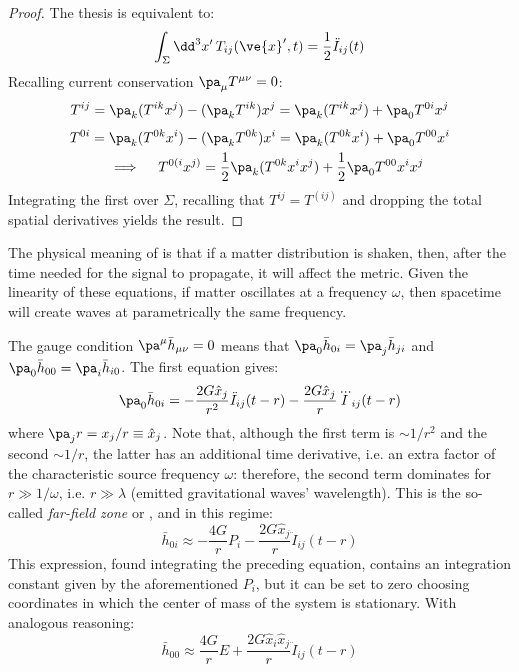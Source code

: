 \begin{proofbox}
  \begin{proof}
    The thesis is equivalent to:
    \begin{equation*}
      \int_\Sigma \dd^3 x'\, T_{ij}(\ve{x}',t) = \frac{1}{2} \ddot{I}_{ij}(t)
    \end{equation*}
    Recalling current conservation $ \pa_\mu T^{\mu \nu} = 0 $:
    \begin{equation*}
      T^{ij} = \pa_k (T^{ik} x^j) - (\pa_k T^{ik}) x^j = \pa_k (T^{ik} x^j) + \pa_0 T^{0i} x^j
    \end{equation*}
    \begin{multline*}
      T^{0i} = \pa_k (T^{0k} x^i) - (\pa_k T^{0k}) x^i = \pa_k (T^{0k} x^i) + \pa_0 T^{00} x^i \\
      \quad \implies \quad
      T^{0(i} x^{j)} = \frac{1}{2} \pa_k (T^{0k} x^i x^j) + \frac{1}{2} \pa_0 T^{00} x^i x^j
    \end{multline*}
    Integrating the first over $ \Sigma $, recalling that $ T^{ij} = T^{(ij)} $ and dropping the total spatial derivatives yields the result.
  \end{proof}
\end{proofbox}

The physical meaning of  is that if a matter distribution is shaken, then, after the time needed for the signal to propagate, it will affect the metric. Given the linearity of these equations, if matter oscillates at a frequency $ \omega $, then spacetime will create waves at parametrically the same frequency.

The gauge condition $ \pa^\mu \bar{h}_{\mu \nu} = 0 $ means that $ \pa_0 \bar{h}_{0i} = \pa_j \bar{h}_{ji} $ and $ \pa_0 \bar{h}_{00} = \pa_i \bar{h}_{i0} $. The first equation gives:
\begin{equation*}
  \pa_0 \bar{h}_{0i} = - \frac{2G \hat{x}_j}{r^2} \ddot{I}_{ij}(t - r) - \frac{2G \hat{x}_j}{r} \dddot{I}_{ij}(t - r)
\end{equation*}
where $ \pa_j r = x_j / r \equiv \hat{x}_j $. Note that, although the first term is $ \sim 1/r^2 $ and the second $ \sim 1/r $, the latter has an additional time derivative, i.e. an extra factor of the characteristic source frequency $ \omega $: therefore, the second term dominates for $ r \gg 1/\omega $, i.e. $ r \gg \lambda $ (emitted gravitational waves' wavelength). This is the so-called \textit{far-field zone} or , and in this regime:
\begin{equation}
  \bar{h}_{0i} \approx - \frac{4G}{r} P_i - \frac{2G \hat{x}_j}{r} \ddot{I}_{ij} (t - r)
\end{equation}
This expression, found integrating the preceding equation, contains an integration constant given by the aforementioned $ P_i $, but it can be set to zero choosing coordinates in which the center of mass of the system is stationary. With analogous reasoning:
\begin{equation}
  \bar{h}_{00} \approx \frac{4G}{r} E + \frac{2G \hat{x}_i \hat{x}_j}{r} \ddot{I}_{ij} (t - r)
\end{equation}

